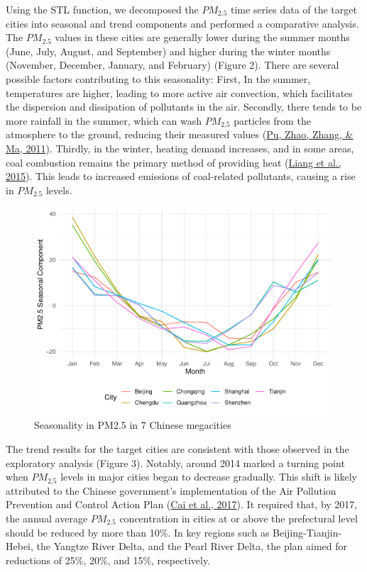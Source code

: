 \documentclass[
  12pt,
]{article}
\begin{document}
Using the STL function, we decomposed the \(PM_{2.5}\) time series data
of the target cities into seasonal and trend components and performed a
comparative analysis. The \(PM_{2.5}\) values in these cities are
generally lower during the summer months (June, July, August, and
September) and higher during the winter months (November, December,
January, and February) (Figure 2). There are several possible factors
contributing to this seasonality: First, In the summer, temperatures are
higher, leading to more active air convection, which facilitates the
dispersion and dissipation of pollutants in the air. Secondly, there
tends to be more rainfall in the summer, which can wash \(PM_{2.5}\)
particles from the atmosphere to the ground, reducing their measured
values (\protect\hyperlink{ref-rain}{Pu, Zhao, Zhang, \& Ma, 2011}).
Thirdly, in the winter, heating demand increases, and in some areas,
coal combustion remains the primary method of providing heat
(\protect\hyperlink{ref-heating}{Liang et al., 2015}). This leads to
increased emissions of coal-related pollutants, causing a rise in
\(PM_{2.5}\) levels.

\begin{figure}
\centering
\includegraphics{LiFangRenZhang_ENV872_Project_files/figure-latex/seasonal figure-1.pdf}
\caption{Seasonality in PM2.5 in 7 Chinese megacities}
\end{figure}

The trend results for the target cities are consistent with those
observed in the exploratory analysis (Figure 3). Notably, around 2014
marked a turning point when \(PM_{2.5}\) levels in major cities began to
decrease gradually. This shift is likely attributed to the Chinese
government's implementation of the Air Pollution Prevention and Control
Action Plan (\protect\hyperlink{ref-plan}{Cai et al., 2017}). It
required that, by 2017, the annual average \(PM_{2.5}\) concentration in
cities at or above the prefectural level should be reduced by more than
10\%. In key regions such as Beijing-Tianjin-Hebei, the Yangtze River
Delta, and the Pearl River Delta, the plan aimed for reductions of 25\%,
20\%, and 15\%, respectively.
\end{document}
